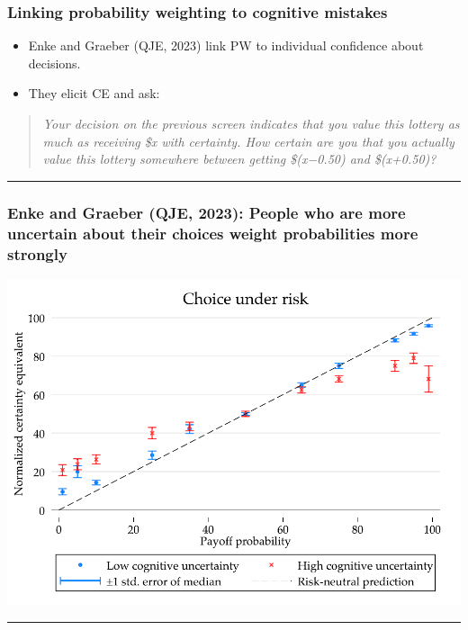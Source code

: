 \documentclass[
  letterpaper,
  DIV=11,
  numbers=noendperiod]{scrartcl}
\providecommand{\tightlist}{%
  \setlength{\itemsep}{0pt}\setlength{\parskip}{0pt}}\usepackage{longtable,booktabs,array}
\begin{document}
\subsubsection{Linking probability weighting to cognitive
mistakes}\label{linking-probability-weighting-to-cognitive-mistakes}

\begin{itemize}
\tightlist
\item
  Enke and Graeber (QJE, 2023) link PW to individual confidence about
  decisions.
\item
  They elicit CE and ask:
\end{itemize}

\begin{quote}
\emph{Your decision on the previous screen indicates that you value this
lottery as much as receiving \$x with certainty. How certain are you
that you actually value this lottery somewhere between getting
\$(x−0.50) and \$(x+0.50)?}
\end{quote}

\begin{center}\rule{0.5\linewidth}{0.5pt}\end{center}

\subsubsection{Enke and Graeber (QJE, 2023): People who are more
uncertain about their choices weight probabilities more
strongly}\label{enke-and-graeber-qje-2023-people-who-are-more-uncertain-about-their-choices-weight-probabilities-more-strongly}

\includegraphics[width=0.7\linewidth,height=\textheight,keepaspectratio]{figures/CognitiveUncertaintyRisk.png}

\begin{center}\rule{0.5\linewidth}{0.5pt}\end{center}
\end{document}
